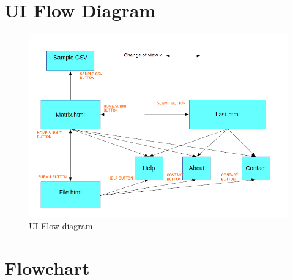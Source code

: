 \newpage
\section{UI Flow Diagram}
\begin{figure}[h]
\centering \includegraphics[scale=0.55]{images/UI.png}
\caption{UI Flow diagram}
\end{figure}

\newpage
\section{Flowchart}

